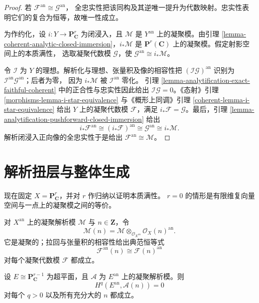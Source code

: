 \begin{proof}
若 $\mathcal F^{\mathrm{an}}\cong\mathcal G^{\mathrm{an}}$，
全忠实性把该同构及其逆唯一提升为代数映射。忠实性表明它们的复合为恒等，故唯一性成立。

为作约化，设 $i:Y\to\mathbf P^r_{\mathbf C}$ 为闭浸入，且
$\mathcal M$ 是 $Y^{\mathrm{an}}$ 上的凝聚模。由引理
\ref{lemma-coherent-analytic-closed-immersion}，$i_*\mathcal M$ 是
$\mathbf P^r(\mathbf C)$ 上的凝聚模。假定射影空间上的本质满性，
选取凝聚代数模 $\mathcal G$，使
$\mathcal G^{\mathrm{an}}\cong i_*\mathcal M$。

令 $\mathcal I$ 为 $Y$ 的理想。解析化与理想、张量积及像的相容性把
$(\mathcal I\mathcal G)^{\mathrm{an}}$ 识别为
$\mathcal I^{\mathrm{an}}\mathcal G^{\mathrm{an}}$；后者为零，
因为 $i_*\mathcal M$ 被 $\mathcal I^{\mathrm{an}}$ 零化。
引理 \ref{lemma-analytification-exact-faithful-coherent} 中的正合性与忠实性因此给出
$\mathcal I\mathcal G=0$。《态射》引理
\ref{morphisms-lemma-i-star-equivalence} 与《概形上同调》引理
\ref{coherent-lemma-i-star-equivalence} 给出 $Y$ 上的凝聚代数模
$\mathcal F$，满足 $i_*\mathcal F=\mathcal G$。最后，引理
\ref{lemma-analytification-pushforward-closed-immersion} 给出
$$
i_*\mathcal F^{\mathrm{an}}
\cong(i_*\mathcal F)^{\mathrm{an}}
\cong\mathcal G^{\mathrm{an}}
\cong i_*\mathcal M.
$$
解析闭浸入正向像的全忠实性于是给出
$\mathcal F^{\mathrm{an}}\cong\mathcal M$。
\end{proof}

\section{解析扭层与整体生成}
\label{section-gaga-analytic-twists}

现在固定 $X=\mathbf P^r_{\mathbf C}$，并对 $r$ 作归纳以证明本质满性。
$r=0$ 的情形是有限维复向量空间与一点上的凝聚模之间的等价。

\begin{definition}
\label{definition-coherent-analytic-twist}
对 $X^{\mathrm{an}}$ 上的凝聚解析模 $\mathcal M$ 与
$n\in\mathbf Z$，令
$$
\mathcal M(n)=
\mathcal M\otimes_{\mathcal O_{X^{\mathrm{an}}}}
\mathcal O_X(n)^{\mathrm{an}}.
$$
它是凝聚的；拉回与张量积的相容性给出典范恒等式
$$
\mathcal F^{\mathrm{an}}(n)\cong\mathcal F(n)^{\mathrm{an}}
$$
对每个凝聚代数模 $\mathcal F$ 都成立。
\end{definition}

\begin{lemma}
\label{lemma-hyperplane-analytic-serre-vanishing}
设 $E\cong\mathbf P^{r-1}_{\mathbf C}$ 为超平面，且 $\mathcal A$
为 $E^{\mathrm{an}}$ 上的凝聚解析模。则
$$
H^q(E^{\mathrm{an}},\mathcal A(n))=0
$$
对每个 $q>0$ 以及所有充分大的 $n$ 都成立。
\end{lemma}

